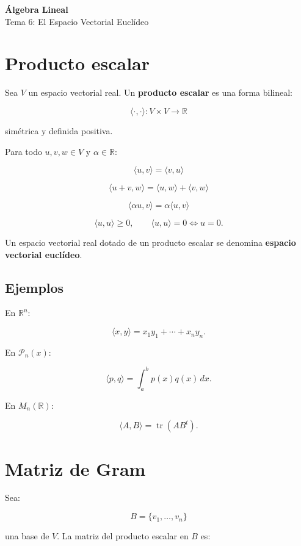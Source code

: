 \documentclass[11pt,a4paper]{article}
\newcommand{\R}{\mathbb{R}}
\newcommand{\tr}{\operatorname{tr}}
\begin{document}
\begin{center}
{\LARGE\bfseries Álgebra Lineal}\\[0.4em]
{\Large Tema 6: El Espacio Vectorial Euclídeo}
\end{center}

\tableofcontents
\newpage

\section{Producto escalar}

Sea $V$ un espacio vectorial real. Un \textbf{producto escalar} es una forma bilineal:

\[
\langle\cdot,\cdot\rangle:V\times V\longrightarrow\R
\]

simétrica y definida positiva.

Para todo $u,v,w\in V$ y $\alpha\in\R$:

\[
\langle u,v\rangle=\langle v,u\rangle
\]

\[
\langle u+v,w\rangle
=
\langle u,w\rangle+\langle v,w\rangle
\]

\[
\langle \alpha u,v\rangle
=
\alpha\langle u,v\rangle
\]

\[
\boxed{
\langle u,u\rangle\geq0,
\qquad
\langle u,u\rangle=0\iff u=0.
}
\]

Un espacio vectorial real dotado de un producto escalar se denomina \textbf{espacio vectorial euclídeo}.

\subsection{Ejemplos}

En $\R^n$:

\[
\boxed{
\langle x,y\rangle
=
x_1y_1+\cdots+x_ny_n.
}
\]

En $\mathcal P_n(x)$:

\[
\boxed{
\langle p,q\rangle
=
\int_a^b p(x)q(x)\,dx.
}
\]

En $M_n(\R)$:

\[
\boxed{
\langle A,B\rangle
=
\tr(AB^t).
}
\]

\section{Matriz de Gram}

Sea:

\[
B=\{v_1,\ldots,v_n\}
\]

una base de $V$. La matriz del producto escalar en $B$ es:
\end{document}
